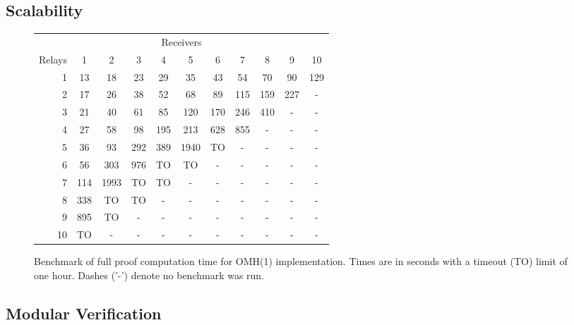 \documentclass{llncs/llncs}
\newcommand{\lee}[1]{ } %
\newcommand{\lee}[1]{ {\color{blue}$<$lee: #1$>$} } %
\begin{document}
\subsection{Scalability}

\begin{figure}
  \centering
  \begin{tabular}{r||c|c|c|c|c|c|c|c|c|c|}
      \multicolumn{11}{c}{Receivers} \\
      \cline{2-11}
   Relays &   1 &   2 &   3 &   4 &   5 &   6 &   7 &   8 &   9 &   10 \\
      \hline \hline
      1   & 13  & 18  & 23  & 29  & 35  & 43  & 54  & 70  & 90  & 129 \\
      \hline
      2   & 17  & 26  & 38  & 52  & 68  & 89  & 115 & 159 & 227 & -   \\
      \hline
      3   & 21  & 40  & 61  & 85  & 120 & 170 & 246 & 410 & -   & -   \\
      \hline
      4   & 27  & 58  & 98  & 195 & 213 & 628 & 855 & -   & -   & -   \\
      \hline
      5   & 36  & 93  & 292 & 389 & 1940& TO  & -   & -   & -   & -   \\
      \hline
      6   & 56  & 303 & 976 & TO  & TO  & -   & -   & -   & -   & -   \\
      \hline
      7   & 114 & 1993& TO  & TO  & -   & -   & -   & -   & -   & -   \\
      \hline
      8   & 338 & TO  & TO  & -   & -   & -   & -   & -   & -   & -   \\
      \hline
      9   & 895 & TO  & -   & -   & -   & -   & -   & -   & -   & -   \\
      \hline
     10   & TO  & -   & -   & -   & -   & -   & -   & -   & -   & -   \\
      \hline
  \end{tabular}
  \label{fig:benchmark}
  \caption{Benchmark of full proof computation time for OMH(1) implementation. Times are in seconds with a timeout (TO) limit of one hour. Dashes ('-') denote no benchmark was run.}
\end{figure}

\lee{let's also check out scalability when we ``turn off'' faults. Also, how hard is it to turn them off or change the fault model? E.g., how many lines of spec need to be changed? Compare to rushby's?}


\subsection{Modular Verification}
\end{document}
